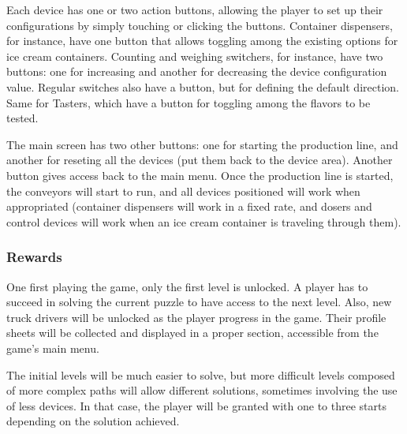 \documentclass[a4paper]{scrartcl}
\begin{document}
		Each device has one or two action buttons, allowing the player to set up their configurations by simply touching or clicking the buttons. Container dispensers, for instance, have one button that allows toggling among the existing options for ice cream containers. Counting and weighing switchers, for instance, have two buttons: one for increasing and another for decreasing the device configuration value. Regular switches also have a button, but for defining the default direction. Same for Tasters, which have a button for toggling among the flavors to be tested.
		
		The main screen has two other buttons: one for starting the production line, and another for reseting all the devices (put them back to the device area). Another button gives access back to the main menu. Once the production line is started, the conveyors will start to run, and all devices positioned will work when appropriated (container dispensers will work in a fixed rate, and dosers and control devices will work when an ice cream container is traveling through them).
		
	\subsubsection{Rewards}
		One first playing the game, only the first level is unlocked. A player has to succeed in solving the current puzzle to have access to the next level. Also, new truck drivers will be unlocked as the player progress in the game. Their profile sheets will be collected and displayed in a proper section, accessible from the game's main menu.
		
		The initial levels will be much easier to solve, but more difficult levels composed of more complex paths will allow different solutions, sometimes involving the use of less devices. In that case, the player will be granted with one to three starts depending on the solution achieved.
		
\end{document}
